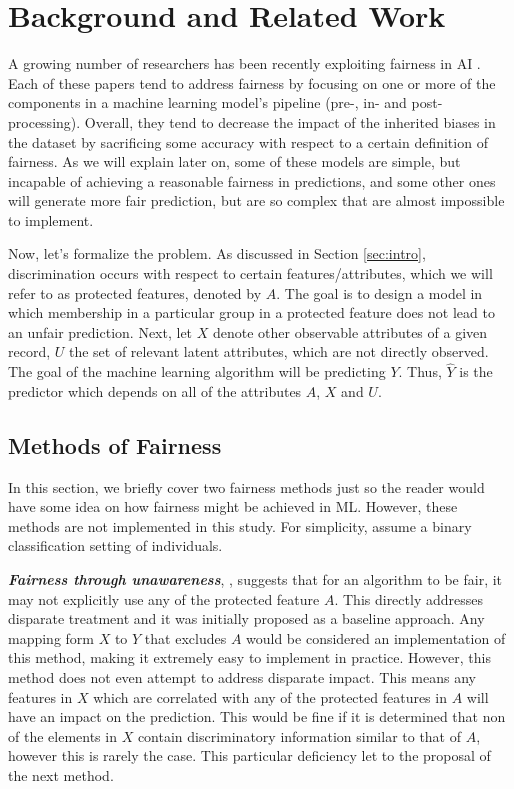 \section{Background and Related Work} \label{sec:background}
A growing number of researchers has been recently exploiting fairness in AI \cite{calmon2017optimized, zafar2017fairness, kusner2017counterfactual, pleiss2017fairness, chiappa2018path, dwork2017decoupled, russell2017worlds, zhang2018fairness}. Each of these papers tend to address fairness by focusing on one or more of the components in a machine learning model's pipeline (pre-, in- and post-processing). Overall, they tend to decrease the impact of the inherited biases in the dataset by sacrificing some accuracy with respect to a certain definition of fairness. As we will explain later on, some of these models are simple, but incapable of achieving a reasonable fairness in predictions, and some other ones will generate more fair prediction, but are so complex that are almost impossible to implement.

Now, let's formalize the problem. As discussed in Section \ref{sec:intro}, discrimination occurs with respect to certain features/attributes, which we will refer to as protected features, denoted by $A$. The goal is to design a model in which membership in a particular group in a protected feature does not lead to an unfair prediction. Next, let $X$ denote other observable attributes of a given record, $U$ the set of relevant latent attributes, which are not directly observed. The goal of the machine learning algorithm will be predicting $Y$. Thus, $\hat{Y}$ is the predictor which depends on all of the attributes $A$, $X$ and $U$.

\subsection{Methods of Fairness}
In this section, we briefly cover two fairness methods just so the reader would have some idea on how fairness might be achieved in ML. However, these methods are not implemented in this study. For simplicity, assume a binary classification setting of individuals.

\textbf{\textit{Fairness through unawareness}}, \citet{grgic2016case}, suggests that for an algorithm to be fair, it may not explicitly use any of the protected feature $A$. This directly addresses disparate treatment and it was initially proposed as a baseline approach. Any mapping form $X$ to $Y$ that excludes $A$ would be considered an implementation of this method, making it extremely easy to implement in practice. However, this method does not even attempt to address disparate impact. This means any features in $X$ which are correlated with any of the protected features in $A$ will have an impact on the prediction. This would be fine if it is determined that non of the elements in $X$ contain discriminatory information similar to that of $A$, however this is rarely the case. This particular deficiency let to the proposal of the next method.

